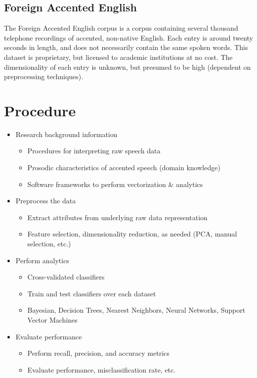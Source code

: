 \documentclass[letterpaper,10pt]{article}
\begin{document}
\subsection{Foreign Accented English}

The Foreign Accented English corpus is a corpus containing several thousand
telephone recordings of accented, non-native English. Each entry is around
twenty seconds in length, and does not necessarily contain the same spoken
words. This dataset is proprietary, but licensed to academic institutions
at no cost. The dimensionality of each entry is unknown, but presumed to be
high (dependent on preprocessing techniques).

\section{Procedure}

\begin{itemize}
  \item Research background information
    \begin{itemize}
    \item Procedures for interpreting raw speech data
    \item Prosodic characteristics of accented speech (domain knowledge)
    \item Software frameworks to perform vectorization \& analytics
    \end{itemize}
  \item Preprocess the data
    \begin{itemize}
    \item Extract attributes from underlying raw data representation
    \item Feature selection, dimensionality reduction, as needed (PCA,
    manual selection, etc.)
    \end{itemize}
  \item Perform analytics
    \begin{itemize}
    \item Cross-validated classifiers
    \item Train and test classifiers over each dataset
    \item Bayesian, Decision Trees, Nearest Neighbors, Neural Networks,
    Support Vector Machines
    \end{itemize}
  \item Evaluate performance
    \begin{itemize}
    \item Perform recall, precision, and accuracy metrics
    \item Evaluate performance, misclassification rate, etc.
    \end{itemize}
\end{itemize}
\end{document}
